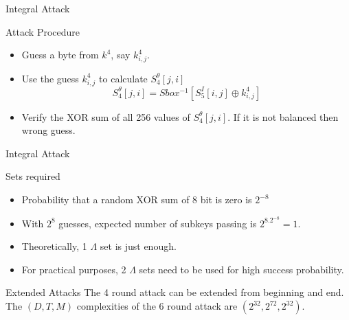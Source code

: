 \begin{frame}{Integral Attack}
  \begin{beamerboxesrounded}{Attack Procedure}
    \begin{itemize}
      \item Guess a byte from $k^4$, say $k^4_{i,j}$.
      \item Use the guess $k^4_{i,j}$ to calculate $S_4^\theta[j,i]$
            \begin{equation*}
              S_4^\theta[j,i] = Sbox^{-1}[S_5^I[i,j] \oplus k_{i,j}^4]
            \end{equation*}
      \item Verify the XOR sum of all 256 values of $S_4^\theta[j,i]$. If it is not balanced then wrong guess.
    \end{itemize}
  \end{beamerboxesrounded}
\end{frame}

\begin{frame}{Integral Attack}
  \begin{beamerboxesrounded}{Sets required}
    \begin{itemize}
      \item Probability that a random XOR sum of 8 bit is zero is $2^{-8}$
      \item With $2^8$ guesses, expected number of subkeys passing is $2^8.2^{-8} = 1$.
      \item Theoretically, 1 $\Lambda$ set is just enough.
      \item For practical purposes, 2 $\Lambda$ sets need to be used for high success probability.
    \end{itemize}
  \end{beamerboxesrounded}

  \vspace{5mm}

  \begin{beamerboxesrounded}{Extended Attacks}
    The 4 round attack can be extended from beginning and end. The $(D,T,M)$ complexities of the 6 round attack are $(2^{32},2^{72},2^{32})$.
  \end{beamerboxesrounded}
\end{frame}

